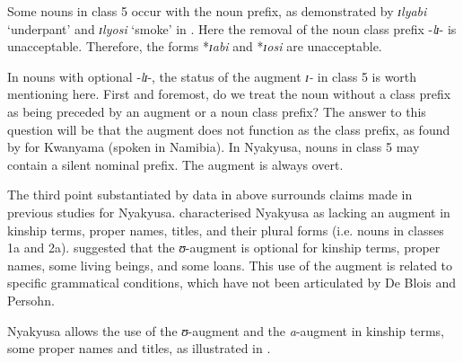 \documentclass[output=paper]{langscibook}
\begin{document}
Some nouns in class 5 occur with the noun prefix, as demonstrated by \textit{ɪlyabi} ‘underpant’ and \textit{ɪlyosi} ‘smoke’ in . Here the removal of the noun class prefix -\textit{lɪ}{}- is unacceptable. Therefore, the forms *\textit{ɪabi} and *\textit{ɪosi} are unacceptable. 

In nouns with optional -\textit{lɪ}{}-, the status of the augment \textit{ɪ{}-} in class 5 is worth mentioning here. First and foremost, do we treat the noun without a class prefix as being preceded by an augment or a noun class prefix? The answer to this question will be that the augment does not function as the class prefix, as found by \citet{Legère2005} for Kwanyama (spoken in Namibia). In Nyakyusa, nouns in class 5 may contain a silent nominal prefix. The augment is always overt.    

The third point substantiated by data in  above surrounds claims made in previous studies for Nyakyusa.  characterised Nyakyusa as lacking an augment in kinship terms, proper names, titles, and their plural forms (i.e. nouns in classes 1a and 2a). \citet[41]{Persohn2017} suggested that the \textit{ʊ}{}-augment is optional for kinship terms, proper names, some living beings, and some loans. This use of the augment is related to specific grammatical conditions, which have not been articulated by De Blois and Persohn.

Nyakyusa allows the use of the \textit{ʊ}{}-augment and the \textit{a}{}-augment in kinship terms, some proper names and titles, as illustrated in . 
\end{document}
